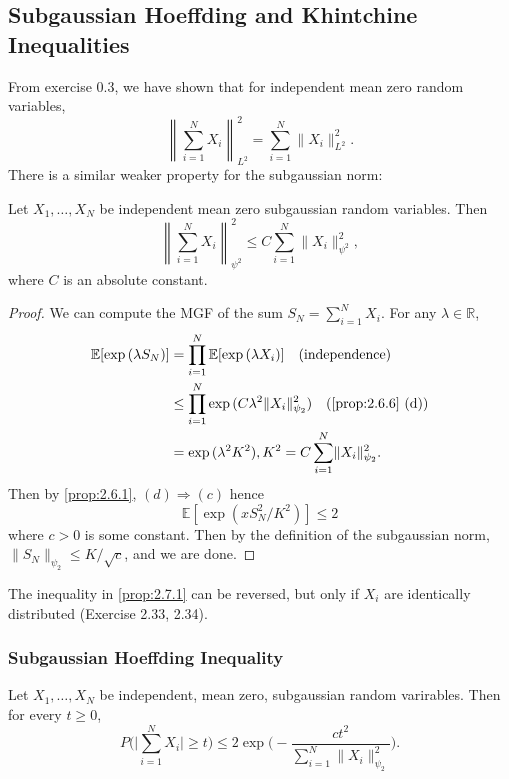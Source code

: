 \subsection{Subgaussian Hoeffding and Khintchine Inequalities}
From exercise 0.3, we have shown that for independent mean zero random variables, 
\[ \left\lVert \sum_{i = 1}^{N} X_i \right\lVert_{L^2}^2 = \sum_{i = 1}^{N} \lVert X_i \rVert_{L^2}^2. \]
There is a similar weaker property for the subgaussian norm: 

\begin{proposition}
\label{prop:2.7.1}
Let $X_1, \dots, X_N$ be independent mean zero subgaussian random variables. Then 
\[ \left\lVert \sum_{i = 1}^{N} X_i \right\lVert_{\psi^2}^2 \leq C\sum_{i = 1}^{N} 
\lVert X_i \rVert_{\psi^2}^2, \]
where $C$ is an absolute constant.
\end{proposition}

\begin{proof}
We can compute the MGF of the sum $S_N = \sum_{i = 1}^{N} X_i$. For any $\lambda \in \mathbb{R}$, 
\begin{align*}
	\mathbb{E}[\exp{(\lambda S_N)}] 
	&= \prod_{i = 1}^{N} \mathbb{E}[\exp{(\lambda X_i)}] \quad \text{(independence)} \\
	&\leq \prod_{i = 1}^{N} \exp{(C \lambda^2 \lVert X_i \rVert_{\psi_2}^2)} 
	\quad \text{(\cref{prop:2.6.6} (d))} \\
	&= \exp{(\lambda^2 K^2)}, K^2 = C \sum_{i = 1}^{N} \lVert X_i \rVert_{\psi_2}^2.
\end{align*}
Then by \cref{prop:2.6.1}, $(d) \Rightarrow (c)$ hence 
\[ \mathbb{E}[\exp{(x S_N^2 / K^2)}] \leq 2 \]
where $c > 0$ is some constant. Then by the definition of the subgaussian norm, $\lVert S_N \rVert_{\psi_2} 
\leq K / \sqrt{c}$, and we are done.
\end{proof}

\begin{remark}
\label{rmk:2.7.2}
The inequality in \cref{prop:2.7.1} can be reversed, but only if $X_i$ are identically distributed 
(Exercise 2.33, 2.34).
\end{remark}


\subsubsection{Subgaussian Hoeffding Inequality}
\begin{theorem}
\label{thm:2.7.3}
Let $X_1, \dots, X_N$ be independent, mean zero, subgaussian random varirables. Then for every $t \geq 0$, 
\[ P \biggl( \bigg| \sum_{i = 1}^{N} X_i \bigg| \geq t \biggr) 
\leq 2\exp{\biggl( -\frac{ct^2}{\sum_{i = 1}^{N} \lVert X_i \rVert_{\psi_2}^2} \biggr)}. \]
\end{theorem}

